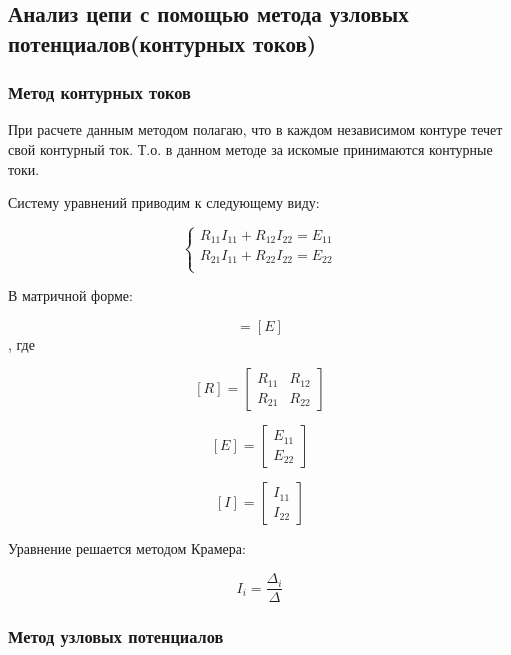 \subsection{Анализ цепи с помощью метода узловых потенциалов(контурных токов)}


\subsubsection{Метод контурных токов}

При расчете данным методом полагаю, что в каждом независимом контуре течет свой контурный ток. Т.о. в данном методе за искомые принимаются контурные токи.

Систему уравнений приводим к следующему виду:



$$
\begin{cases}
R_{11} I_{11} + R_{12} I_{22}   = E_{11} \\
R_{21} I_{11} + R_{22} I_{22}   = E_{22} \\
\end{cases}
$$

В матричной форме:

\begin{equation}
[R][I]=[E]
\end{equation}
, где

$$
[R]=
\left[
\begin{array}{cc}
R_{11} & R_{12} \\
R_{21} & R_{22} 
\end{array}
\right]
$$

$$
[E]=
\left[
\begin{array}{cc}
E_{11} \\
E_{22} 
\end{array}
\right]
$$

$$
[I]=
\left[
\begin{array}{cc}
I_{11} \\
I_{22} 
\end{array}
\right]
$$

Уравнение решается методом Крамера:

\begin{equation}
I_{i} = \frac{\Delta_{i}}{\Delta}
\end{equation}

\subsubsection{Метод узловых потенциалов}

